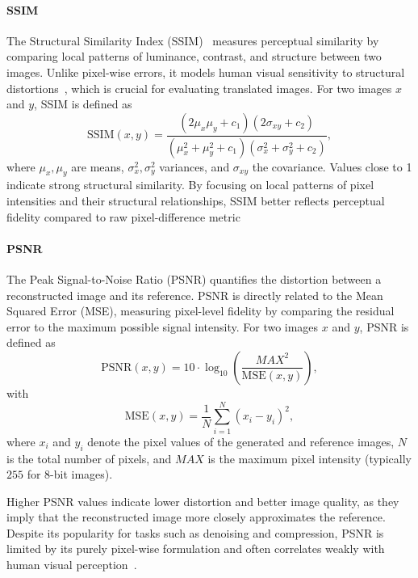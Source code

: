 \paragraph{SSIM}
The Structural Similarity Index (SSIM)~\cite{iqa_ssim} measures perceptual similarity by comparing local patterns of luminance, contrast, and structure between two images. Unlike pixel-wise errors, it models human visual sensitivity to structural distortions~\cite{DiffCR,hvt_cgan}, which is crucial for evaluating translated images. For two images $x$ and $y$, SSIM is defined as
\begin{equation}
\text{SSIM}(x,y) = \frac{(2\mu_x \mu_y + c_1)(2\sigma_{xy} + c_2)}{(\mu_x^2 + \mu_y^2 + c_1)(\sigma_x^2 + \sigma_y^2 + c_2)},
\end{equation}
where $\mu_x, \mu_y$ are means, $\sigma_x^2, \sigma_y^2$ variances, and $\sigma_{xy}$ the covariance. Values close to 1 indicate strong structural similarity. By focusing on local patterns of pixel intensities and their structural relationships, SSIM better reflects perceptual fidelity compared to raw pixel-difference metric


\paragraph{PSNR} 
The Peak Signal-to-Noise Ratio (PSNR) quantifies the distortion between a reconstructed image and its reference. PSNR is directly related to the Mean Squared Error (MSE), measuring pixel-level fidelity by comparing the residual error to the maximum possible signal intensity. For two images $x$ and $y$, PSNR is defined as
\begin{equation}
\text{PSNR}(x,y) = 10 \cdot \log_{10} \left( \frac{MAX^2}{\text{MSE}(x,y)} \right),
\end{equation}
with
\begin{equation}
\text{MSE}(x,y) = \frac{1}{N} \sum_{i=1}^{N} (x_i - y_i)^2,
\end{equation}
where $x_i$ and $y_i$ denote the pixel values of the generated and reference images, $N$ is the total number of pixels, and $MAX$ is the maximum pixel intensity (typically $255$ for 8-bit images).  

Higher PSNR values indicate lower distortion and better image quality, as they imply that the reconstructed image more closely approximates the reference. Despite its popularity for tasks such as denoising and compression, PSNR is limited by its purely pixel-wise formulation and often correlates weakly with human visual perception~\cite{DiffCR}.

